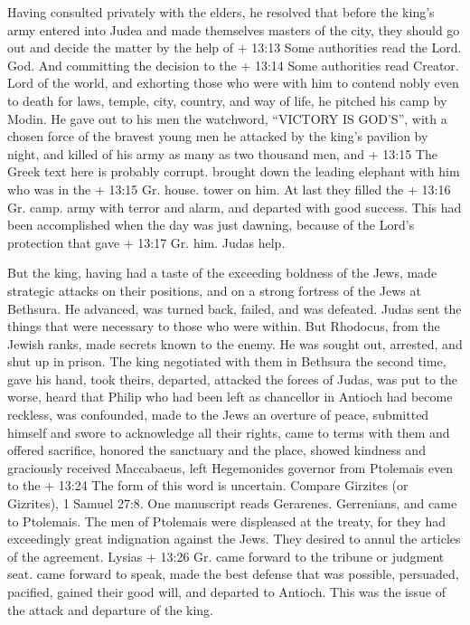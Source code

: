  Having consulted privately with the elders, he resolved
that before the king's army entered into Judea and made themselves
masters of the city, they should go out and decide the matter by the
help of + 13:13 Some authorities read the Lord. God.  And
committing the decision to the + 13:14 Some authorities read Creator.
Lord of the world, and exhorting those who were with him to contend
nobly even to death for laws, temple, city, country, and way of life, he
pitched his camp by Modin.  He gave out to his men the
watchword, ``VICTORY IS GOD'S'', with a chosen force of the bravest
young men he attacked by the king's pavilion by night, and killed of his
army as many as two thousand men, and + 13:15 The Greek text here is
probably corrupt. brought down the leading elephant with him who was in
the + 13:15 Gr. house. tower on him.  At last they filled
the + 13:16 Gr. camp. army with terror and alarm, and departed with good
success.  This had been accomplished when the day was just
dawning, because of the Lord's protection that gave + 13:17 Gr. him.
Judas help.

 But the king, having had a taste of the exceeding boldness
of the Jews, made strategic attacks on their positions, 
and on a strong fortress of the Jews at Bethsura. He advanced, was
turned back, failed, and was defeated.  Judas sent the
things that were necessary to those who were within.  But
Rhodocus, from the Jewish ranks, made secrets known to the enemy. He was
sought out, arrested, and shut up in prison.  The king
negotiated with them in Bethsura the second time, gave his hand, took
theirs, departed, attacked the forces of Judas, was put to the worse,
 heard that Philip who had been left as chancellor in
Antioch had become reckless, was confounded, made to the Jews an
overture of peace, submitted himself and swore to acknowledge all their
rights, came to terms with them and offered sacrifice, honored the
sanctuary and the place,  showed kindness and graciously
received Maccabaeus, left Hegemonides governor from Ptolemais even to
the + 13:24 The form of this word is uncertain. Compare Girzites (or
Gizrites), 1 Samuel 27:8. One manuscript reads Gerarenes. Gerrenians,
 and came to Ptolemais. The men of Ptolemais were
displeased at the treaty, for they had exceedingly great indignation
against the Jews. They desired to annul the articles of the agreement.
 Lysias + 13:26 Gr. came forward to the tribune or judgment
seat. came forward to speak, made the best defense that was possible,
persuaded, pacified, gained their good will, and departed to Antioch.
This was the issue of the attack and departure of the king.

